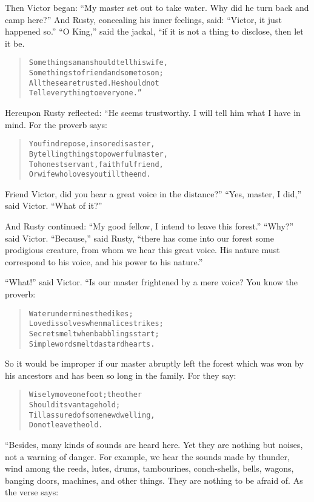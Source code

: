 \documentclass[article, twoside, 14pt]{memoir}
\renewenvironment{verbatim}{%
\begin{quote}%
\vskip -10pt%
\begin{alltt}\normalfont\large}{\end{alltt}%
\end{quote}%
\vskip -10pt
} %
\begin{document}
Then Victor began:
``My master set out to take water. Why did he turn back and camp here?''
And Rusty, concealing his inner feelings, said:
``Victor, it just happened so.'' ``O King,'' said the jackal, “if
it is not a thing to disclose, then let it be.

\begin{verbatim}
Some things a man should tell his wife,
    Some things to friend and some to son;
All these are trusted. He should not
    Tell everything to everyone.”
\end{verbatim}
Hereupon Rusty reflected: “He seems trustworthy. I will tell him
what I have in mind. For the proverb says:

\begin{verbatim}
You find repose, in sore disaster,
By telling things to powerful master,
To honest servant, faithful friend,
Or wife who loves you till the end.
\end{verbatim}
Friend Victor, did you hear a great voice in the distance?”
``Yes, master, I did,'' said Victor. ``What of it?''

And Rusty continued:
``My good fellow, I intend to leave this forest.'' ``Why?'' said
Victor. ``Because,'' said Rusty,
``there has come into our forest some prodigious creature, from whom we hear this great voice. His nature must correspond to his voice, and his power to his nature.''

``What!'' said Victor. “Is our master frightened by a mere voice?
You know the proverb:

\begin{verbatim}
Water undermines the dikes;
Love dissolves when malice strikes;
Secrets melt when babblings start;
Simple words melt dastard hearts.
\end{verbatim}
So it would be improper if our master abruptly left the forest
which was won by his ancestors and has been so long in the family.
For they say:

\begin{verbatim}
Wisely move one foot; the other
    Should its vantage hold;
Till assured of some new dwelling,
    Do not leave the old.
\end{verbatim}
“Besides, many kinds of sounds are heard here. Yet they are nothing
but noises, not a warning of danger. For example, we hear the
sounds made by thunder, wind among the reeds, lutes, drums,
tambourines, conch-shells, bells, wagons, banging doors, machines,
and other things. They are nothing to be afraid of. As the verse
says:
\end{document}
